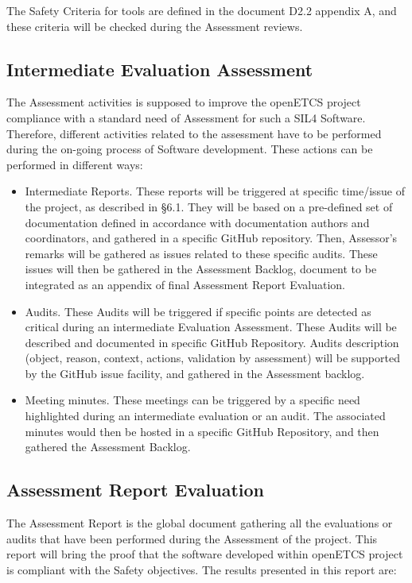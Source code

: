 \documentclass[openetcs]{template/openetcs_article}
\begin{document}
The Safety Criteria for tools are defined in the document D2.2 appendix A, and these criteria will be checked during the Assessment reviews. 

\subsection{Intermediate Evaluation Assessment}
The Assessment activities is supposed to improve the openETCS project compliance with a standard need of Assessment for such a SIL4 Software.
Therefore, different activities related to the assessment have to be performed during the on-going process of Software development. These actions can be performed in different ways:

\begin{itemize}
\item Intermediate Reports. These reports will be triggered at specific time/issue of the project, as described in §6.1. They will be based on a pre-defined set
of documentation defined in accordance with documentation authors and coordinators, and gathered in a specific GitHub repository. Then, Assessor's remarks will
be gathered as issues related to these specific audits. These issues will then be gathered in the Assessment Backlog, document to be integrated as an
appendix of final Assessment Report Evaluation.
\item Audits. These Audits will be triggered if specific points are detected as critical during an intermediate Evaluation Assessment. These Audits will be
described and documented in specific GitHub Repository. Audits description (object, reason, context, actions, validation by assessment) will be supported by the
GitHub issue facility, and gathered in the Assessment backlog.
\item Meeting minutes. These meetings can be triggered by a specific need highlighted during an intermediate evaluation or an audit. The associated minutes
would then be hosted in a specific GitHub Repository, and then gathered the Assessment Backlog.
\end{itemize}


\subsection{Assessment Report Evaluation}
The Assessment Report is the global document gathering all the evaluations or audits that have been performed during the Assessment of the project.
This report will bring the proof that the software developed within openETCS project is compliant with the Safety objectives.
The results presented in this report are:
\end{document}
